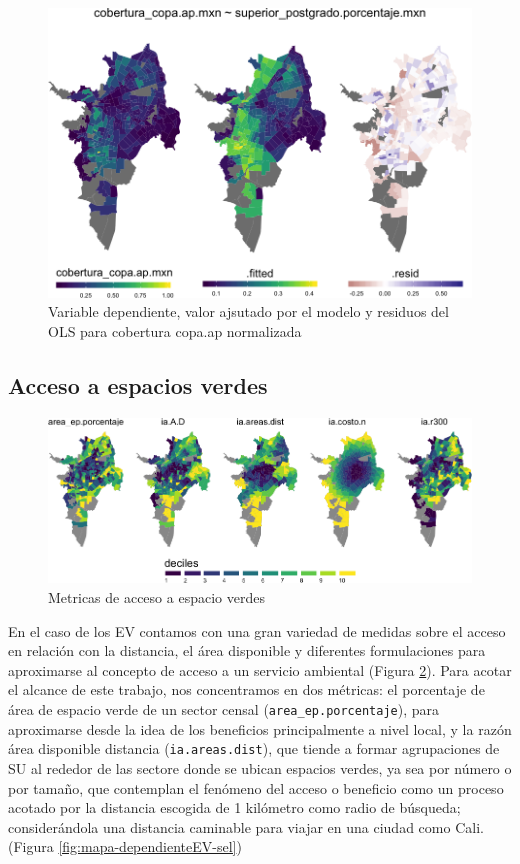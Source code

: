 \documentclass[12pt,]{book}
\begin{document}
\begin{figure}
\includegraphics[width=1\linewidth]{tesis-unigis_files/figure-latex/mapas-lm-copaap-1} \caption{Variable dependiente, valor ajsutado por el modelo y residuos del OLS para cobertura copa.ap normalizada}\label{fig:mapas-lm-copaap}
\end{figure}

\subsection{Acceso a espacios verdes}\label{acceso-a-espacios-verdes}

\begin{figure}
\includegraphics[width=1\linewidth]{tesis-unigis_files/figure-latex/mapa-dependienteEV-all-1} \caption{Metricas de acceso a espacio verdes}\label{fig:mapa-dependienteEV-all}
\end{figure}

En el caso de los EV contamos con una gran variedad de medidas sobre el
acceso en relación con la distancia, el área disponible y diferentes
formulaciones para aproximarse al concepto de acceso a un servicio
ambiental (Figura \ref{fig:mapa-dependienteEV-all}). Para acotar el
alcance de este trabajo, nos concentramos en dos métricas: el porcentaje
de área de espacio verde de un sector censal
(\texttt{area\_ep.porcentaje}), para aproximarse desde la idea de los
beneficios principalmente a nivel local, y la razón área disponible
distancia (\texttt{ia.areas.dist}), que tiende a formar agrupaciones de
SU al rededor de las sectore donde se ubican espacios verdes, ya sea por
número o por tamaño, que contemplan el fenómeno del acceso o beneficio
como un proceso acotado por la distancia escogida de 1 kilómetro como
radio de búsqueda; considerándola una distancia caminable para viajar en
una ciudad como Cali. (Figura \ref{fig:mapa-dependienteEV-sel})
\end{document}
